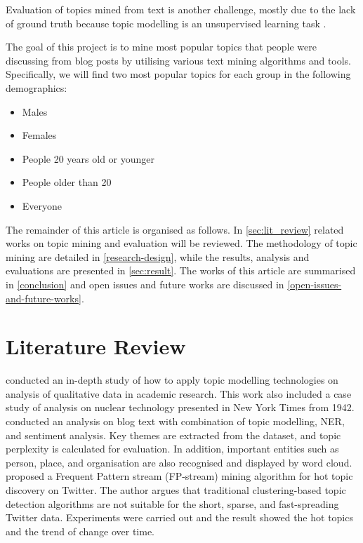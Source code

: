\documentclass[conference]{IEEEtran}
\providecommand{\tightlist}{%
  \setlength{\itemsep}{0pt}\setlength{\parskip}{0pt}
}
\begin{document}
Evaluation of topics mined from text is another challenge, mostly due to
the lack of ground truth because topic modelling is an unsupervised
learning task \autocite{boyd-graber_care_nodate}.

The goal of this project is to mine most popular topics that people were
discussing from blog posts by utilising various text mining algorithms
and tools. Specifically, we will find two most popular topics for each
group in the following demographics:

\begin{itemize}
\tightlist
\item
  Males
\item
  Females
\item
  People 20 years old or younger
\item
  People older than 20
\item
  Everyone
\end{itemize}

The remainder of this article is organised as follows. In
\cref{sec:lit_review} related works on topic mining and evaluation will
be reviewed. The methodology of topic mining are detailed in
\cref{research-design}, while the results, analysis and evaluations are
presented in \cref{sec:result}. The works of this article are summarised
in \cref{conclusion} and open issues and future works are discussed in
\cref{open-issues-and-future-works}.

\hypertarget{sec:lit-review}{%
\section{Literature Review}\label{sec:lit-review}}

\textcite{jacobi_quantitative_2016} conducted an in-depth study of how
to apply topic modelling technologies on analysis of qualitative data in
academic research. This work also included a case study of analysis on
nuclear technology presented in New York Times from 1942.
\textcite{waila_blog_2013} conducted an analysis on blog text with
combination of topic modelling, NER, and sentiment analysis. Key themes
are extracted from the dataset, and topic perplexity is calculated for
evaluation. In addition, important entities such as person, place, and
organisation are also recognised and displayed by word cloud.
\textcite{guo_mining_2012} proposed a Frequent Pattern stream
(FP-stream) mining algorithm for hot topic discovery on Twitter. The
author argues that traditional clustering-based topic detection
algorithms are not suitable for the short, sparse, and fast-spreading
Twitter data. Experiments were carried out and the result showed the hot
topics and the trend of change over time.
\end{document}
